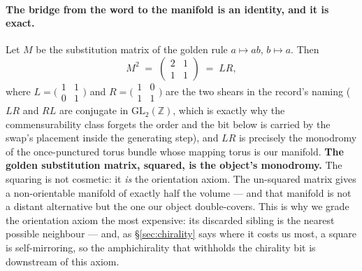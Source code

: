 \documentclass[11pt,a4paper]{article}
\theoremstyle{definition}
\theoremstyle{remark}
\newcommand{\Z}{\mathbb{Z}}
\begin{document}
\paragraph{The bridge from the word to the manifold is an identity, and it is exact.} Let $M$ be the
substitution matrix of the golden rule $a \mapsto ab$, $b \mapsto a$. Then
\[
M^2 \;=\; \begin{pmatrix}2&1\\1&1\end{pmatrix} \;=\; LR,
\]
where $L = \bigl(\begin{smallmatrix}1&1\\0&1\end{smallmatrix}\bigr)$ and
$R = \bigl(\begin{smallmatrix}1&0\\1&1\end{smallmatrix}\bigr)$ are the two shears in the record's naming ($LR$ and $RL$ are
conjugate in $\mathrm{GL}_2(\Z)$, which is exactly why the commensurability class forgets the order and the bit below is
carried by the swap's placement inside the generating step), and $LR$ is precisely the monodromy of the once-punctured torus bundle whose mapping torus is our
manifold. \textbf{The golden substitution matrix, squared, is the object's monodromy.} The squaring
is not cosmetic: it \emph{is} the orientation axiom. The un-squared matrix gives a non-orientable
manifold of exactly half the volume --- and that manifold is not a distant alternative but the one
our object double-covers. This is why we grade the orientation axiom the most expensive: its
discarded sibling is the nearest possible neighbour --- and, as \S\ref{sec:chirality} says where it costs us most, a square
is self-mirroring, so the amphichirality that withholds the chirality bit is downstream of this axiom.
\end{document}
